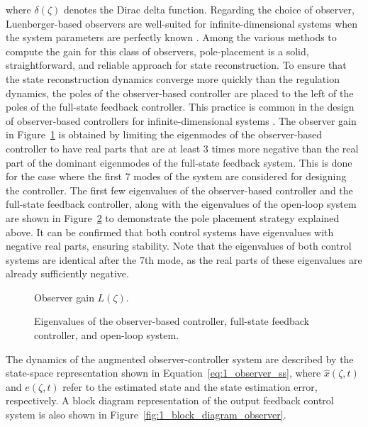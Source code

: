 where $\delta(\zeta)$ denotes the Dirac delta function. Regarding the choice of observer, Luenberger-based observers are well-suited for infinite-dimensional systems when the system parameters are perfectly known \autocite{Ali2015Review}. Among the various methods to compute the gain for this class of observers, pole-placement is a solid, straightforward, and reliable approach for state reconstruction. To ensure that the state reconstruction dynamics converge more quickly than the regulation dynamics, the poles of the observer-based controller are placed to the left of the poles of the full-state feedback controller. This practice is common in the design of observer-based controllers for infinite-dimensional systems \autocite{Morris2020Controller}. The observer gain in Figure~\ref{fig:1_L_modes} is obtained by limiting the eigenmodes of the observer-based controller to have real parts that are at least 3 times more negative than the real part of the dominant eigenmodes of the full-state feedback system. This is done for the case where the first 7 modes of the system are considered for designing the controller. The first few eigenvalues of the observer-based controller and the full-state feedback controller, along with the eigenvalues of the open-loop system are shown in Figure~\ref{fig:1_eigs} to demonstrate the pole placement strategy explained above. It can be confirmed that both control systems have eigenvalues with negative real parts, ensuring stability. Note that the eigenvalues of both control systems are identical after the 7th mode, as the real parts of these eigenvalues are already sufficiently negative.

\begin{figure}[!htbp]
    \centering
    
    \caption{Observer gain ${L}(\zeta)$.}
    \label{fig:1_L_modes}
\end{figure}

\begin{figure}[!htbp]
    \centering
    
    \caption{Eigenvalues of the observer-based controller, full-state feedback controller, and open-loop system.}
    \label{fig:1_eigs}
\end{figure}

The dynamics of the augmented observer-controller system are described by the state-space representation shown in Equation~\ref{eq:1_observer_ss}, where $\hat{{x}}(\zeta, t)$ and ${e}(\zeta, t)$ refer to the estimated state and the state estimation error, respectively. A block diagram representation of the output feedback control system is also shown in Figure~\ref{fig:1_block_diagram_observer}.

